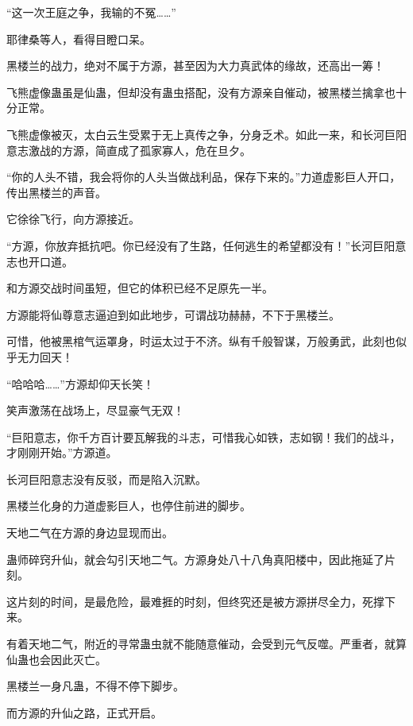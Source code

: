 \begin{this_body}
“这一次王庭之争，我输的不冤……”

耶律桑等人，看得目瞪口呆。

黑楼兰的战力，绝对不属于方源，甚至因为大力真武体的缘故，还高出一筹！

飞熊虚像蛊虽是仙蛊，但却没有蛊虫搭配，没有方源亲自催动，被黑楼兰擒拿也十分正常。

飞熊虚像被灭，太白云生受累于无上真传之争，分身乏术。如此一来，和长河巨阳意志激战的方源，简直成了孤家寡人，危在旦夕。

“你的人头不错，我会将你的人头当做战利品，保存下来的。”力道虚影巨人开口，传出黑楼兰的声音。

它徐徐飞行，向方源接近。

“方源，你放弃抵抗吧。你已经没有了生路，任何逃生的希望都没有！”长河巨阳意志也开口道。

和方源交战时间虽短，但它的体积已经不足原先一半。

方源能将仙尊意志逼迫到如此地步，可谓战功赫赫，不下于黑楼兰。

可惜，他被黑棺气运罩身，时运太过于不济。纵有千般智谋，万般勇武，此刻也似乎无力回天！

“哈哈哈……”方源却仰天长笑！

笑声激荡在战场上，尽显豪气无双！

“巨阳意志，你千方百计要瓦解我的斗志，可惜我心如铁，志如钢！我们的战斗，才刚刚开始。”方源道。

长河巨阳意志没有反驳，而是陷入沉默。

黑楼兰化身的力道虚影巨人，也停住前进的脚步。

天地二气在方源的身边显现而出。

蛊师碎窍升仙，就会勾引天地二气。方源身处八十八角真阳楼中，因此拖延了片刻。

这片刻的时间，是最危险，最难捱的时刻，但终究还是被方源拼尽全力，死撑下来。

有着天地二气，附近的寻常蛊虫就不能随意催动，会受到元气反噬。严重者，就算仙蛊也会因此灭亡。

黑楼兰一身凡蛊，不得不停下脚步。

而方源的升仙之路，正式开启。

\end{this_body}

